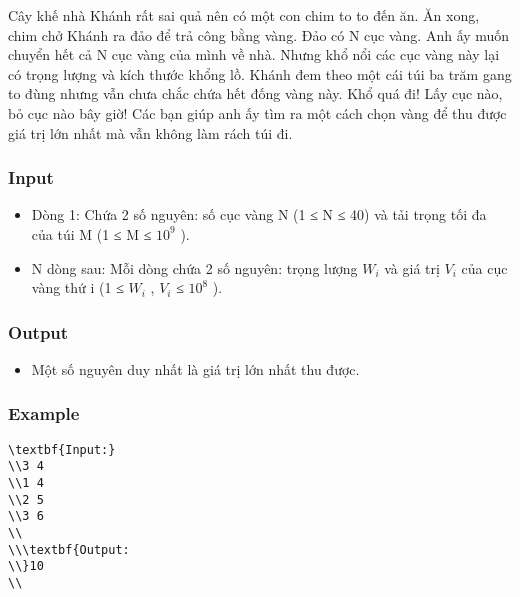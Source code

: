 



   Cây khế nhà Khánh rất sai quả nên có một con chim to to đến ăn. Ăn xong, chim chở Khánh ra đảo để trả công bằng vàng. Đảo có N cục vàng. Anh ấy muốn chuyển hết cả N cục vàng của mình về nhà. Nhưng khổ nổi các cục vàng này lại có trọng lượng và kích thước khổng lồ. Khánh đem theo một cái túi ba trăm gang to đùng nhưng vẫn chưa chắc chứa hết đống vàng này. Khổ quá đi! Lấy cục nào, bỏ cục nào bây giờ! Các bạn giúp anh ấy tìm ra một cách chọn vàng để thu được giá trị lớn nhất mà vẫn không làm rách túi đi.  

\subsubsection{   Input  }
\begin{itemize}
	\item     Dòng 1: Chứa 2 số nguyên: số cục vàng N (1 ≤ N ≤ 40) và tải trọng tối đa của túi M (1 ≤ M ≤ $10^{9}$    ).   
	\item     N dòng sau: Mỗi dòng chứa 2 số nguyên: trọng lượng $W_{i}$    và giá trị $V_{i}$    của cục vàng thứ i (1 ≤ $W_{i}$    , $V_{i}$    ≤ $10^{8}$    ).   
\end{itemize}

\subsubsection{   Output  }
\begin{itemize}
	\item     Một số nguyên duy nhất là giá trị lớn nhất thu được.   
\end{itemize}

\subsubsection{   Example  }
\begin{verbatim}
\textbf{Input:}
\\3 4
\\1 4
\\2 5
\\3 6
\\
\\\textbf{Output:
\\}10
\\\end{verbatim}
